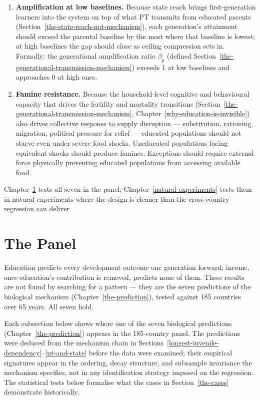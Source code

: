 \documentclass[12pt,letterpaper]{article}
\begin{document}
\begin{enumerate}
\item \textbf{Amplification at low baselines.} Because state reach
brings first-generation learners into the system on top of what PT
transmits from educated parents
(Section~\ref{the-state-reach-not-mechanism}), each generation's
attainment should exceed the parental baseline by the most where that
baseline is lowest; at high baselines the gap should close as ceiling
compression sets in. Formally: the generational amplification ratio
$\beta_g$ (defined
Section~\ref{the-generational-transmission-mechanism}) exceeds 1 at low
baselines and approaches 0 at high ones.\label{pred:amplification}

\item \textbf{Famine resistance.} Because the household-level cognitive
and behavioural capacity that drives the fertility and mortality
transitions (Section~\ref{the-generational-transmission-mechanism},
Chapter~\ref{why-education-is-invisible}) also drives collective
response to supply disruption --- substitution, rationing, migration,
political pressure for relief --- educated populations should not starve
even under severe food shocks. Uneducated populations facing equivalent
shocks should produce famines. Exceptions should require external force
physically preventing educated populations from accessing available
food.\label{pred:famine}
\end{enumerate}

Chapter~\ref{the-panel} tests all seven in the panel; Chapter~\ref{natural-experiments} tests them in natural experiments where the design is cleaner than the cross-country regression can deliver.


\section{The Panel}\label{the-panel}

Education predicts every development outcome one generation forward; income, once education's contribution is removed, predicts none of them. These results are not found by searching for a pattern --- they are the seven predictions of the biological mechanism (Chapter~\ref{the-prediction}), tested against 185 countries over 65 years. All seven hold.

Each subsection below shows where one of the seven biological
predictions (Chapter~\ref{the-prediction}) appears in the 185-country
panel. The predictions were deduced from the mechanism chain in
Sections~\ref{longest-juvenile-dependency}--\ref{pt-and-state} before
the data were examined; their empirical signatures appear in the
ordering, decay structure, and subsample invariance the mechanism
specifies, not in any identification strategy imposed on the
regression. The statistical tests below formalise what the cases in
Section~\ref{the-cases} demonstrate historically.
\end{document}
